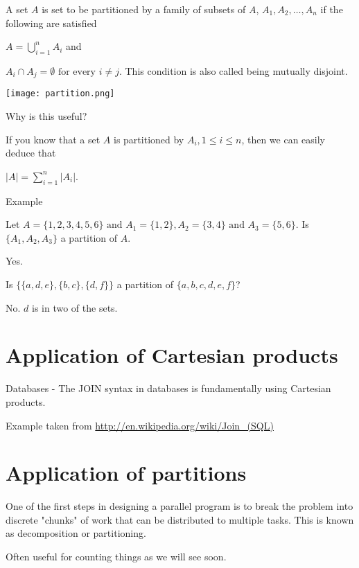 \documentclass[12pt]{article}
\begin{document}
A set $A$ is set to be partitioned by a family of subsets of $A$, $A_1, A_2, \ldots, A_n$ if the following are satisfied

$\displaystyle A = \bigcup_{i=1}^n A_i$ and

$\displaystyle A_i \cap A_j = \emptyset \text{ for every } i \neq j$. This condition is also called being mutually disjoint.

\texttt{[image: partition.png]}

Why is this useful?

If you know that a set $A$ is partitioned by $A_i, 1 \le i \le n$, then we can easily deduce that

$\displaystyle |A| = \sum_{i=1}^n |A_i|$.

Example

Let $A = \{1,2,3,4,5,6\} \text{ and } A_1 = \{1,2\}, A_2 = \{3,4\} \text{ and } A_3 = \{5,6\}$. Is $\{A_1, A_2, A_3\}$ a partition of $A$.

Yes. 

Is $\{\{a,d,e\},\{b,c\},\{d,f\}\}$ a partition of $\{a,b,c,d,e,f\}$?

No. $d$ is in two of the sets.



\section*{Application of Cartesian products}

Databases - The JOIN syntax in databases is fundamentally using Cartesian products.

Example taken from \href{http://en.wikipedia.org/wiki/Join\_(SQL)}{http://en.wikipedia.org/wiki/Join\_(SQL)}

\section*{Application of partitions}

One of the first steps in designing a parallel program is to break the problem into discrete "chunks" of work that can be distributed to multiple tasks. This is known as decomposition or partitioning.

Often useful for counting things as we will see soon.
\end{document}
